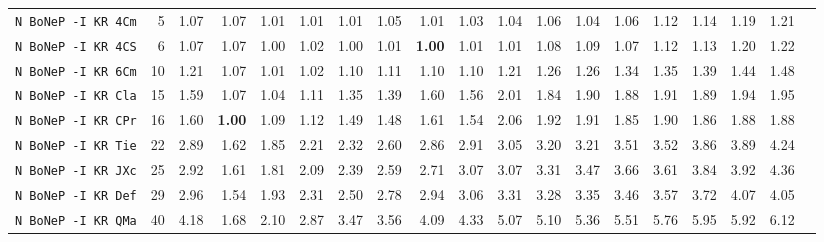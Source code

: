 \begin{tabular}{l | r @{~~} r | r@{~~}r@{~~}r@{~~}r@{~~}r@{~~}r@{~~}r@{~~}r@{~~}r@{~~}r@{~~}r@{~~}r@{~~}r@{~~}r@{~~}r@{~~}r|}
\verb+N BoNeP -I KR 4Cm+ & 5 & 1.07 & 1.07&1.01&1.01&1.01&1.05&1.01&1.03&1.04&1.06&1.04&1.06&1.12&1.14&1.19&1.21\\
\verb+N BoNeP -I KR 4CS+ & 6 & 1.07 & 1.07&1.00&1.02&1.00&1.01&\textbf{1.00}&1.01&1.01&1.08&1.09&1.07&1.12&1.13&1.20&1.22\\
\verb+N BoNeP -I KR 6Cm+ & 10 & 1.21 & 1.07&1.01&1.02&1.10&1.11&1.10&1.10&1.21&1.26&1.26&1.34&1.35&1.39&1.44&1.48\\
\verb+N BoNeP -I KR Cla+ & 15 & 1.59 & 1.07&1.04&1.11&1.35&1.39&1.60&1.56&2.01&1.84&1.90&1.88&1.91&1.89&1.94&1.95\\
\verb+N BoNeP -I KR CPr+ & 16 & 1.60 & \textbf{1.00}&1.09&1.12&1.49&1.48&1.61&1.54&2.06&1.92&1.91&1.85&1.90&1.86&1.88&1.88\\
\verb+N BoNeP -I KR Tie+ & 22 & 2.89 & 1.62&1.85&2.21&2.32&2.60&2.86&2.91&3.05&3.20&3.21&3.51&3.52&3.86&3.89&4.24\\
\verb+N BoNeP -I KR JXc+ & 25 & 2.92 & 1.61&1.81&2.09&2.39&2.59&2.71&3.07&3.07&3.31&3.47&3.66&3.61&3.84&3.92&4.36\\
\verb+N BoNeP -I KR Def+ & 29 & 2.96 & 1.54&1.93&2.31&2.50&2.78&2.94&3.06&3.31&3.28&3.35&3.46&3.57&3.72&4.07&4.05\\
\verb+N BoNeP -I KR QMa+ & 40 & 4.18 & 1.68&2.10&2.87&3.47&3.56&4.09&4.33&5.07&5.10&5.36&5.51&5.76&5.95&5.92&6.12\\
\end{tabular}
